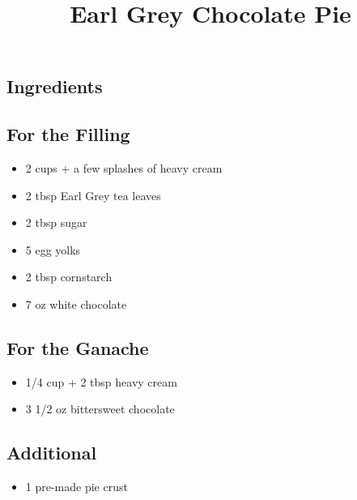 \documentclass[12pt]{article}
\title{Earl Grey Chocolate Pie}
\author{}
\date{}
\begin{document}
\maketitle

\begin{multicols}{2}
    \section*{Ingredients}
    \subsection*{For the Filling}
    \begin{itemize}
        \item 2 cups + a few splashes of heavy cream
        \item 2 tbsp Earl Grey tea leaves
        \item 2 tbsp sugar
        \item 5 egg yolks
        \item 2 tbsp cornstarch
        \item 7 oz white chocolate
    \end{itemize}

    \subsection*{For the Ganache}
    \begin{itemize}
        \item 1/4 cup + 2 tbsp heavy cream
        \item 3 1/2 oz bittersweet chocolate
    \end{itemize}

    \subsection*{Additional}
    \begin{itemize}
        \item 1 pre-made pie crust
    \end{itemize}

    \columnbreak


\end{multicols}
\end{document}
